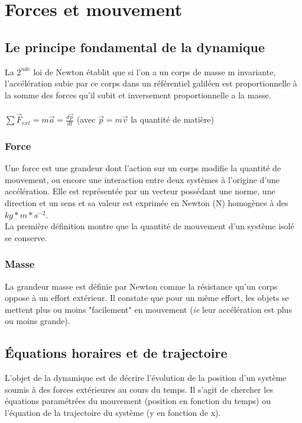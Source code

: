 \documentclass[a4paper,10pt]{book}
\begin{document}
\section{Forces et mouvement}
\subsection{Le principe fondamental de la dynamique}
La $2^{nde}$ loi de Newton établit que si l'on a un corps de masse m invariante, l'accélération subie par ce corps dans un référentiel galiléen est proportionnelle à la somme des forces qu'il subit et inversement proportionnelle a la masse.\\\\
$\sum\vec{F}_{ext}=m \vec{a}=\frac{d\vec{p}}{dt}$ (avec $\vec{p}=m\vec{v}$ la quantité de matière)\\

\subsubsection{Force}
Une force est une grandeur dont l'action sur un corps modifie la quantité de mouvement, ou encore une interaction entre deux systèmes à l'origine d'une accélération. Elle est représentée par un vecteur possédant une norme, une direction et un sens et sa valeur est exprimée en Newton (N) homogènes à des $kg*m*s^{-2}$.\\
La première définition montre que la quantité de mouvement d'un système isolé se conserve.\\

\subsubsection{Masse}
La grandeur masse est définie par Newton comme la résistance qu’un corps oppose à un effort extérieur. Il constate que pour un même effort, les objets se mettent plus ou moins "facilement" en mouvement (\textit{ie} leur accélération est plus ou moins grande).\\

\subsection{Équations horaires et de trajectoire}
L'objet de la dynamique est de décrire l’évolution de la position d'un système soumis à des forces extérieures au cours du temps. Il s'agit de chercher les équations paramétrées du mouvement (position en fonction du temps) ou l'équation de la trajectoire du système (y en fonction de x).\\
\end{document}
